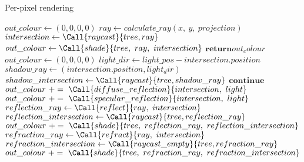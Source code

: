 \begin{algorithm}
\caption{Per-pixel rendering}
\label{alg:render}
\begin{algorithmic}[1]
	\State $out\_colour \gets (0, 0, 0, 0)$
	\State $ray \gets calculate\_ray(x,~y,~projection)$
	\State $intersection \gets \Call{raycast}{tree, ray}$
		\State $out\_colour \gets \Call{shade}{tree,~ ray,~ intersection}$
	\EndIf
	\State $\textbf{return} out_colour$
\EndProcedure
\\
	\State $out\_colour \gets (0, 0, 0, 0)$
	 
		\State $light\_dir \gets light\_pos - intersection.position$ 
		\State $shadow\_ray \gets (intersection.position, light_dir)$
		\State $shadow\_intersection \gets \Call{raycast}{tree, shadow\_ray}$
			\State $\textbf{continue}$
		\EndIf
		\State $out\_colour ~+=~ \Call{diffuse\_reflection}{intersection,~light}$
		\State $out\_colour ~+=~ \Call{specular\_reflection}{intersection,~light}$
	\EndFor
	\\
	\State $reflection\_ray \gets \Call{reflect}{ray,~intersection}$ 
	\State $reflection\_intersection \gets \Call{raycast}{tree, reflection\_ray}$
		\State $out\_colour ~+=~ \Call{shade}{tree,~ reflection\_ray,~ reflection\_intersection}$
	\EndIf
	\\
	\State $refraction\_ray \gets \Call{refract}{ray,~intersection}$ 
	\State $refraction\_intersection \gets \Call{raycast\_empty}{tree, refraction\_ray}$
		\State $out\_colour ~+=~ \Call{shade}{tree,~ refraction\_ray,~ refraction\_intersection}$
	\EndIf
\EndProcedure
\end{algorithmic}
\end{algorithm}